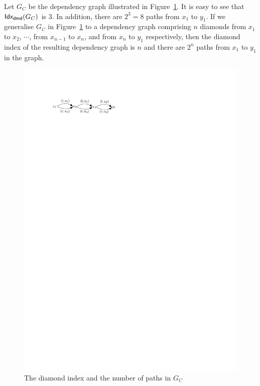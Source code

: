 \begin{example}
Let $G_C$ be the dependency graph illustrated in Figure~\ref{fig-dmdidx-exmp}. It is easy to see that ${\sf Idx_{dmd}}(G_C)$ is $3$. In addition, there are $2^3=8$ paths from $x_1$ to $y_1$. If we generalise $G_C$ in Figure~\ref{fig-dmdidx-exmp} to a dependency graph comprising $n$ diamonds from $x_1$ to $x_2$, $\cdots$, from $x_{n-1}$ to $x_n$, and from $x_n$ to $y_1$ respectively, then the diamond index of the resulting dependency graph is $n$ and there are $2^n$ paths from $x_1$ to $y_1$ in the graph.
\begin{figure}[htbp]
\begin{center}
\includegraphics[scale=0.7]{dmdidx-example.pdf}
\end{center}
\caption{The diamond index  and the number of paths in $G_C$}\label{fig-dmdidx-exmp}
\end{figure}
\end{example}

